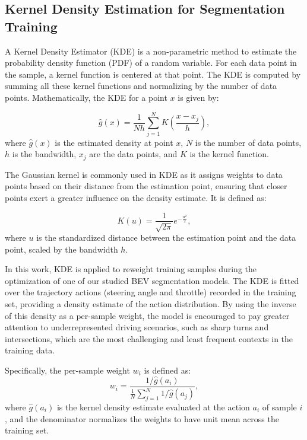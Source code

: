 \documentclass[12pt]{article}
\begin{document}
\subsection{Kernel Density Estimation for Segmentation Training}
\label{sec:kde}

A Kernel Density Estimator (KDE) is a non-parametric method to estimate the probability density function (PDF) of a random variable.
%
For each data point in the sample, a kernel function is centered at that point. The KDE is computed by summing all these kernel functions and normalizing by the number of data points.
Mathematically, the KDE for a point $x$ is given by:

\begin{equation}
   \hat{g}(x) = \frac{1}{N h} \sum_{j=1}^{N} K \left( \frac{x - x_j}{h} \right),
    \label{eq:kde}
\end{equation}
where $\hat{g}(x)$ is the estimated density at point $x$, $N$ is the number of data points, $h$ is the bandwidth, $x_j$ are the data points, and $K$ is the kernel function.

The Gaussian kernel is commonly used in KDE as it assigns weights to data points based on their distance from the estimation point, ensuring that closer points exert a greater influence on the density estimate. It is defined as:

\[ K(u) = \frac{1}{\sqrt{2\pi}} e^{-\frac{u^2}{2}}, \]
where $u$ is the standardized distance between the estimation point and the data point, scaled by the bandwidth $h$.

In this work, KDE is applied to reweight training samples during the optimization of one of our studied  BEV segmentation models.
%
The KDE is fitted over the trajectory actions (steering angle and throttle) recorded in the training set, providing a density estimate of the action distribution.
%
By using the inverse of this density as a per-sample weight, the model is encouraged to pay greater attention to underrepresented driving scenarios, such as sharp turns and intersections, which are the most challenging and least frequent contexts in the training data.

Specifically, the per-sample weight $w_i$ is defined as:
\begin{equation}
    w_i = \frac{1 / \hat{g}(a_i)}{\frac{1}{N}\sum_{j=1}^{N} 1/\hat{g}(a_j)},
    \label{eq:kde_weight}
\end{equation}
where $\hat{g}(a_i)$ is the kernel density estimate evaluated at the action $a_i$ of sample $i$, and the denominator normalizes the weights to have unit mean across the training set.
\end{document}
